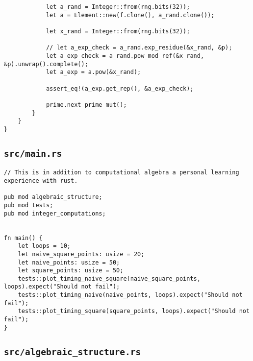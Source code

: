 \begin{verbatim}
            let a_rand = Integer::from(rng.bits(32));
            let a = Element::new(f.clone(), a_rand.clone());

            let x_rand = Integer::from(rng.bits(32));

            // let a_exp_check = a_rand.exp_residue(&x_rand, &p);
            let a_exp_check = a_rand.pow_mod_ref(&x_rand, &p).unwrap().complete();
            let a_exp = a.pow(&x_rand);

            assert_eq!(a_exp.get_rep(), &a_exp_check);

            prime.next_prime_mut();
        }
    }
}
\end{verbatim}


\subsection{\lstinline{src/main.rs}}

\begin{verbatim}
// This is in addition to computational algebra a personal learning experience with rust.

pub mod algebraic_structure;
pub mod tests;
pub mod integer_computations;


fn main() {
    let loops = 10;
    let naive_square_points: usize = 20;
    let naive_points: usize = 50;
    let square_points: usize = 50;
    tests::plot_timing_naive_square(naive_square_points, loops).expect("Should not fail");
    tests::plot_timing_naive(naive_points, loops).expect("Should not fail");
    tests::plot_timing_square(square_points, loops).expect("Should not fail");
}
\end{verbatim}

\subsection{\lstinline{src/algebraic_structure.rs}}

